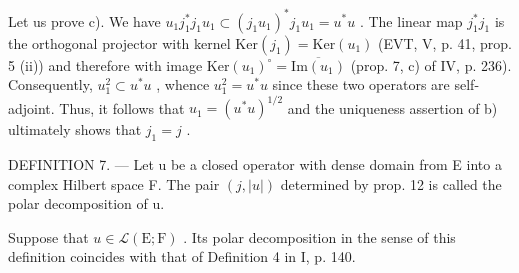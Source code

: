 Let us prove c). We have \(u_{1}j_{1}^{*}j_{1}u_{1}\subset(j_{1}u_{1})^{*}j_{1}u_{1}=u^{*}u\) . The linear map \(j_{1}^{*}j_{1}\) is the orthogonal projector with kernel \(\mathrm{Ker}(j_{1})=\mathrm{Ker}(u_{1})\) (EVT, V, p. 41, prop. 5 (ii)) and therefore with image \(\mathrm{Ker}(u_{1})^{\circ}=\overline{\mathrm{Im}(u_{1})}\) (prop. 7, c) of IV, p. 236). Consequently, \(u_{1}^{2}\subset u^{*}u\) , whence \(u_{1}^{2}=u^{*}u\) since these two operators are self-adjoint. Thus, it follows that \(u_{1}=(u^{*}u)^{1/2}\) and the uniqueness assertion of b) ultimately shows that \(j_{1}=j\) .

DEFINITION 7. --- Let u be a closed operator with dense domain from E into a complex Hilbert space F. The pair \((j, |u|)\) determined by prop. 12 is called the polar decomposition of u.

Suppose that \(u \in \mathcal{L}(\mathrm{E};\mathrm{F})\) . Its polar decomposition in the sense of this definition coincides with that of Definition 4 in I, p. 140.

